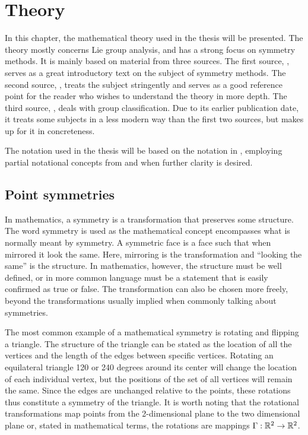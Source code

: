 \chapter{Theory}

In this chapter, the mathematical theory used in the thesis will be presented.
The theory mostly concerns Lie group analysis, and has a strong focus on symmetry methods. %
It is mainly based on material from three sources.
The first source, \cite{hydon2000symmetry}, serves as a great introductory text on the subject of symmetry methods.
The second source, \cite{olver1995equivalence}, treats the subject stringently and serves as a good reference point for the reader who wishes to understand the theory in more depth.
The third source, \cite{ovsiannikov1982group}, deals with group classification.
Due to its earlier publication date, it treats some subjects in a less modern way than the first two sources, but makes up for it in concreteness.

The notation used in the thesis will be based on the notation in \cite{hydon2000symmetry}, employing partial notational concepts from \cite{olver1995equivalence} and \cite{ovsiannikov1982group} when further clarity is desired.

\section{Point symmetries}

In mathematics, a symmetry is a transformation that preserves some structure.
The word symmetry is used as the mathematical concept encompasses what is normally meant by symmetry.
A symmetric face is a face such that when mirrored it look the same.
Here, mirroring is the transformation and \enquote{looking the same} is the structure.
In mathematics, however, the structure must be well defined, or in more common language must be a statement that is easily confirmed as true or false.
The transformation can also be chosen more freely, beyond the transformations usually implied when commonly talking about symmetries.

The most common example of a mathematical symmetry is rotating and flipping a triangle.
The structure of the triangle can be stated as the location of all the vertices and the length of the edges between specific vertices.
Rotating an equilateral triangle 120 or 240 degrees around its center will change the location of each individual vertex, but the positions of the set of all vertices will remain the same.
Since the edges are unchanged relative to the points, these rotations thus constitute a symmetry of the triangle.
It is worth noting that the rotational transformations map points from the 2-dimensional plane to the two dimensional plane or, stated in mathematical terms, the rotations are mappings \(\Gamma: \mathbb{R}^2 \to \mathbb{R}^2\).

